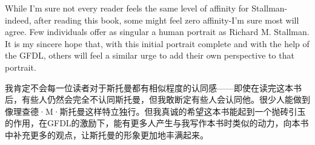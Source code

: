 \ifdefined\eng
While I'm sure not every reader feels the same level of affinity for Stallman-indeed, after reading this book, some might feel zero affinity-I'm sure most will agree. Few individuals offer as singular a human portrait as Richard M. Stallman. It is my sincere hope that, with this initial portrait complete and with the help of the GFDL, others will feel a similar urge to add their own perspective to that portrait.
\fi

\ifdefined\chs
我肯定不会每一位读者对于斯托曼都有相似程度的认同感——即使在读完这本书后，有些人仍然会完全不认同斯托曼，但我敢断定有些人会认同他。很少人能做到像理查德·M·斯托曼这样特立独行。但我真诚的希望这本书能起到一个抛砖引玉的作用，在GFDL的激励下，能有更多人产生与我写作本书时类似的动力，向本书中补充更多的观点，让斯托曼的形象更加地丰满起来。
\fi

\theendnotes
\setcounter{endnote}{0}
